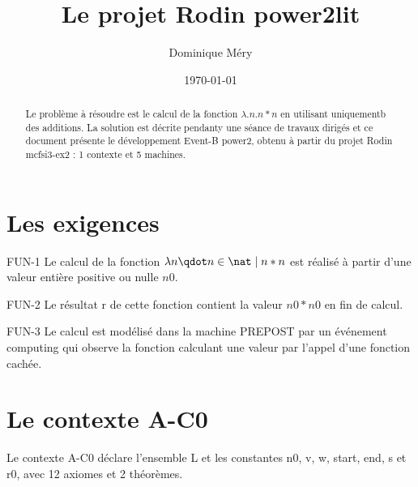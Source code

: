 \documentclass[11pt,a4paper]{article}
\title{Le projet Rodin power2lit}
\author{Dominique Méry}
\date{\today}
\begin{document}
\maketitle


\begin{abstract}

  Le problème à résoudre est le calcul de la fonction $\lambda. n
  . n*n$ en utilisant  uniquementb des additions.  La solution est
  décrite  pendanty une séance de travaux dirigés et ce document présente le développement Event-B \textsf{power2}, obtenu à partir du projet Rodin \textsf{mcfsi3-ex2} : 1 contexte et 5 machines. 

  
\end{abstract}


\section{Les exigences}


\begin{requirement}{FUN-1}
  Le calcul de la fonction  $\lambda n \qdot n \in \nat \mid n*n$ est réalisé à
  partir d'une valeur  entière positive ou nulle $n0$.
\end{requirement}

\begin{requirement}{FUN-2}
  Le résultat r de cette fonction  contient la valeur $n0*n0$ en fin
  de  calcul.
\end{requirement}

\begin{requirement}{FUN-3}
  Le calcul est modélisé dans la machine \textsf{PREPOST} par un
  événement  computing qui  observe  la fonction calculant une valeur
  par l'appel d'une fonction cachée.
\end{requirement}



\section{Le contexte A-C0}

Le contexte \textsf{A-C0} déclare l'ensemble \textsf{L} et les constantes \textsf{n0}, \textsf{v}, \textsf{w}, \textsf{start}, \textsf{end}, \textsf{s} et \textsf{r0}, avec 12 axiomes et 2 théorèmes.
\end{document}
